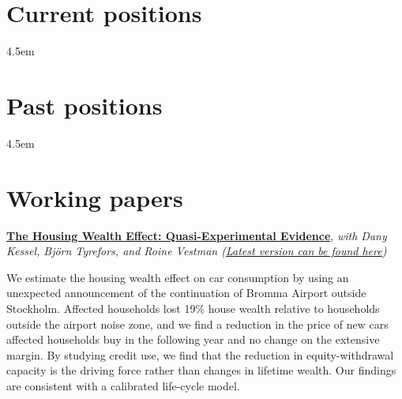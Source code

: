 \documentclass{clean_cv}
\newcommand{\datetabspace}{4.5em}
\begin{document}
\section{Current positions}

\begin{datetabular}{\datetabspace}

\end{datetabular}

\section{Past positions}
\begin{datetabular}{\datetabspace}
\end{datetabular}

\section{Working papers}

\href{https://roinevestman.com/wp-content/uploads/2023/03/DP18034-compressed.pdf}{\textbf{The Housing Wealth Effect: Quasi-Experimental Evidence}}, \emph{with Dany Kessel, Björn Tyrefors, and Roine Vestman (\href{https://roinevestman.com/wp-content/uploads/2023/03/DP18034-compressed.pdf}{Latest version can be found \underline{here}})}

We estimate the housing wealth effect on car consumption by using an unexpected announcement of the continuation of Bromma Airport outside Stockholm. Affected households lost 19\% house wealth relative to households outside the airport noise zone, and we find a reduction in the price of new cars affected households buy in the following year and no change on the extensive margin. By studying credit use, we find that the reduction in equity-withdrawal capacity is the driving force rather than changes in lifetime wealth. Our findings are consistent with a calibrated life-cycle model.
\end{document}
